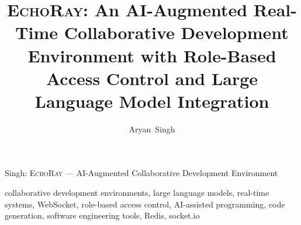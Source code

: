 \documentclass[journal,12pt,onecolumn]{IEEEtran}
\newcommand{\echoray}{\textsc{EchoRay}}
\begin{document}
\title{\echoray: An AI-Augmented Real-Time Collaborative Development
Environment with Role-Based Access Control and Large Language Model
Integration}

\author{Aryan~Singh}

%
{Singh: \echoray{} --- AI-Augmented Collaborative Development Environment}

\maketitle

\begin{abstract}

\end{abstract}

\begin{IEEEkeywords}
collaborative development environments, large language models, real-time
systems, WebSocket, role-based access control, AI-assisted programming,
code generation, software engineering tools, Redis, socket.io
\end{IEEEkeywords}














\end{document}

